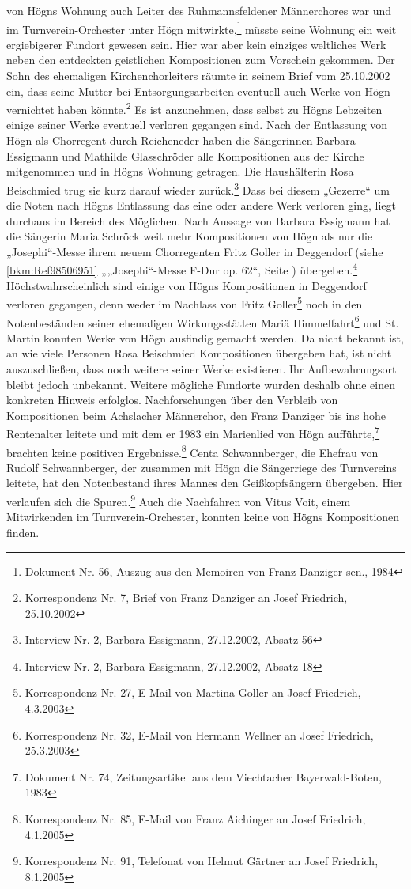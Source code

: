 \documentclass[a4paper]{article}
\begin{document}
von Högns Wohnung auch Leiter des Ruhmannsfeldener Männerchores war und
im Turnverein-Orchester unter Högn mitwirkte,\footnote{ Dokument Nr.
56, Auszug aus den Memoiren von Franz Danziger sen., 1984} müsste seine
Wohnung ein weit ergiebigerer Fundort gewesen sein. Hier war aber kein
einziges weltliches Werk neben den entdeckten geistlichen Kompositionen
zum Vorschein gekommen. Der Sohn des ehemaligen Kirchenchorleiters
räumte in seinem Brief vom 25.10.2002 ein, dass seine Mutter bei
Entsorgungsarbeiten eventuell auch Werke von Högn vernichtet haben
könnte.\footnote{ Korrespondenz Nr. 7, Brief von Franz Danziger an
Josef Friedrich, 25.10.2002} Es ist anzunehmen, dass selbst zu Högns
Lebzeiten einige seiner Werke eventuell verloren gegangen sind. Nach
der Entlassung von Högn als Chorregent durch Reicheneder haben die
Sängerinnen Barbara Essigmann und Mathilde Glasschröder alle
Kompositionen aus der Kirche mitgenommen und in Högns Wohnung getragen.
Die Haushälterin Rosa Beischmied trug sie kurz darauf wieder
zurück.\footnote{ Interview Nr. 2, Barbara Essigmann, 27.12.2002,
Absatz 56} Dass bei diesem „Gezerre“ um die Noten nach Högns Entlassung
das eine oder andere Werk verloren ging, liegt durchaus im Bereich des
Möglichen. Nach Aussage von Barbara Essigmann hat die Sängerin Maria
Schröck weit mehr Kompositionen von Högn als nur die „Josephi“-Messe
ihrem neuem Chorregenten Fritz Goller in Deggendorf (siehe
\ref{bkm:Ref98506951} „„Josephi“-Messe F-Dur op. 62“, Seite
\pageref{bkm:Ref98506963}) übergeben.\footnote{ Interview Nr. 2,
Barbara Essigmann, 27.12.2002, Absatz 18} Höchstwahrscheinlich sind
einige von Högns Kompositionen in Deggendorf verloren gegangen, denn
weder im Nachlass von Fritz Goller\footnote{ Korrespondenz Nr. 27,
E-Mail von Martina Goller an Josef Friedrich, 4.3.2003} noch in den
Notenbeständen seiner ehemaligen Wirkungsstätten Mariä
Himmelfahrt\footnote{ Korrespondenz Nr. 32, E-Mail von Hermann Wellner
an Josef Friedrich, 25.3.2003} und St. Martin konnten Werke von Högn
ausfindig gemacht werden. Da nicht bekannt ist, an wie viele Personen
Rosa Beischmied Kompositionen übergeben hat, ist nicht auszuschließen,
dass noch weitere seiner Werke existieren. Ihr Aufbewahrungsort bleibt
jedoch unbekannt. Weitere mögliche Fundorte wurden deshalb ohne einen
konkreten Hinweis erfolglos. Nachforschungen über den Verbleib von
Kompositionen beim Achslacher Männerchor, den Franz Danziger bis ins
hohe Rentenalter leitete und mit dem er 1983 ein Marienlied von Högn
aufführte,\footnote{ Dokument Nr. 74, Zeitungsartikel aus dem
Viechtacher Bayerwald-Boten, 1983} brachten keine positiven
Ergebnisse.\footnote{ Korrespondenz Nr. 85, E-Mail von Franz Aichinger
an Josef Friedrich, 4.1.2005} Centa Schwannberger, die Ehefrau von
Rudolf Schwannberger, der zusammen mit Högn die Sängerriege des
Turnvereins leitete, hat den Notenbestand ihres Mannes den
Geißkopfsängern übergeben. Hier verlaufen sich die Spuren.\footnote{
Korrespondenz Nr. 91, Telefonat von Helmut Gärtner an Josef Friedrich,
8.1.2005} Auch die Nachfahren von Vitus Voit, einem Mitwirkenden im
Turnverein-Orchester, konnten keine von Högns Kompositionen finden.
\end{document}

